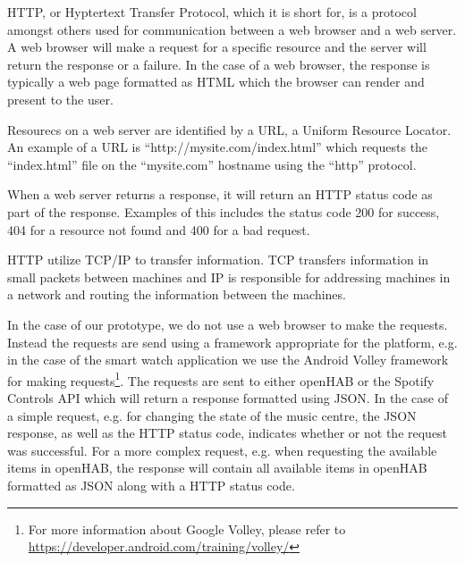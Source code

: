 HTTP, or Hyptertext Transfer Protocol, which it is short for, is a protocol amongst others used for communication between a web browser and a web server. A web browser will make a request for a specific resource and the server will return the response or a failure. In the case of a web browser, the response is typically a web page formatted as HTML which the browser can render and present to the user.

Resourecs on a web server are identified by a URL, a Uniform Resource Locator. An example of a URL is ``http://mysite.com/index.html'' which requests the ``index.html'' file on the ``mysite.com'' hostname using the ``http'' protocol.

When a web server returns a response, it will return an HTTP status code as part of the response. Examples of this includes the status code 200 for success, 404 for a resource not found and 400 for a bad request.

HTTP utilize TCP/IP to transfer information. TCP transfers information in small packets between machines and IP is responsible for addressing machines in a network and routing the information between the machines.

In the case of our prototype, we do not use a web browser to make the requests. Instead the requests are send using a framework appropriate for the platform, e.g. in the case of the smart watch application we use the Android Volley framework for making requests\footnote{For more information about Google Volley, please refer to \url{https://developer.android.com/training/volley/}}.
The requests are sent to either openHAB or the Spotify Controls API which will return a response formatted using JSON. In the case of a simple request, e.g. for changing the state of the music centre, the JSON response, as well as the HTTP status code, indicates whether or not the request was successful. For a more complex request, e.g. when requesting the available items in openHAB, the response will contain all available items in openHAB formatted as JSON along with a HTTP status code.



